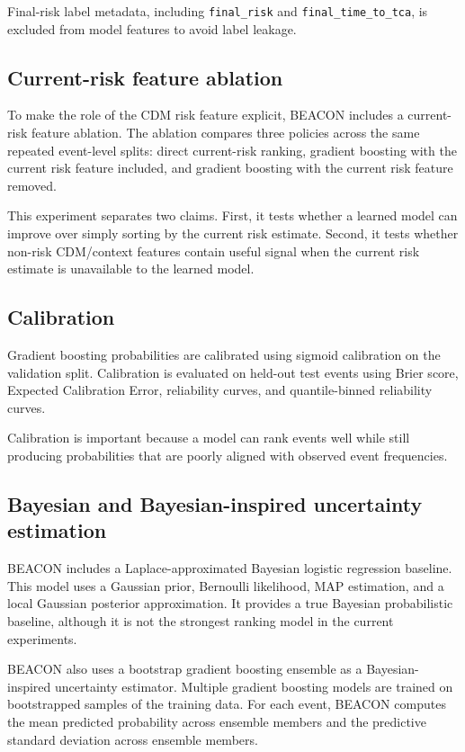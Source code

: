 \documentclass[11pt]{article}
\begin{document}
Final-risk label metadata, including \texttt{final\_risk} and \texttt{final\_time\_to\_tca}, is excluded from model features to avoid label leakage.

\subsection{Current-risk feature ablation}

To make the role of the CDM risk feature explicit, BEACON includes a current-risk feature ablation. The ablation compares three policies across the same repeated event-level splits: direct current-risk ranking, gradient boosting with the current risk feature included, and gradient boosting with the current risk feature removed.

This experiment separates two claims. First, it tests whether a learned model can improve over simply sorting by the current risk estimate. Second, it tests whether non-risk CDM/context features contain useful signal when the current risk estimate is unavailable to the learned model.

\subsection{Calibration}

Gradient boosting probabilities are calibrated using sigmoid calibration on the validation split. Calibration is evaluated on held-out test events using Brier score, Expected Calibration Error, reliability curves, and quantile-binned reliability curves.

Calibration is important because a model can rank events well while still producing probabilities that are poorly aligned with observed event frequencies.

\subsection{Bayesian and Bayesian-inspired uncertainty estimation}

BEACON includes a Laplace-approximated Bayesian logistic regression baseline. This model uses a Gaussian prior, Bernoulli likelihood, MAP estimation, and a local Gaussian posterior approximation. It provides a true Bayesian probabilistic baseline, although it is not the strongest ranking model in the current experiments.

BEACON also uses a bootstrap gradient boosting ensemble as a Bayesian-inspired uncertainty estimator. Multiple gradient boosting models are trained on bootstrapped samples of the training data. For each event, BEACON computes the mean predicted probability across ensemble members and the predictive standard deviation across ensemble members.
\end{document}
